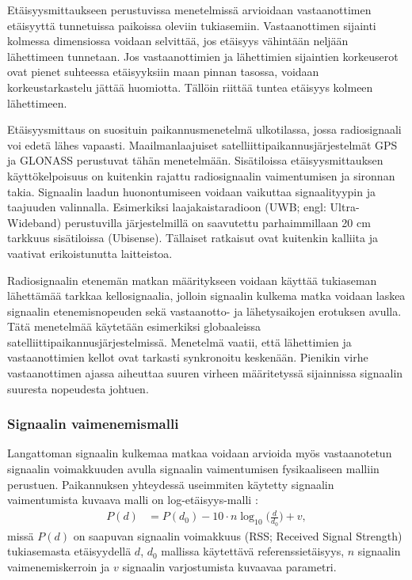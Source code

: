 Etäisyysmittaukseen perustuvissa menetelmissä arvioidaan vastaanottimen
etäisyyttä tunnetuissa paikoissa oleviin tukiasemiin.  Vastaanottimen sijainti
kolmessa dimensiossa voidaan selvittää, jos etäisyys vähintään neljään
lähettimeen tunnetaan. Jos vastaanottimien ja lähettimien sijaintien
korkeuserot ovat pienet suhteessa etäisyyksiin maan pinnan tasossa, voidaan
korkeustarkastelu jättää huomiotta. Tällöin riittää tuntea etäisyys kolmeen
lähettimeen.

Etäisyysmittaus on suosituin paikannusmenetelmä ulkotilassa, jossa
radiosignaali voi edetä lähes vapaasti.  Maailmanlaajuiset
satelliittipaikannusjärjestelmät GPS ja GLONASS perustuvat tähän menetelmään.
Sisätiloissa etäisyysmittauksen käyttökelpoisuus on kuitenkin rajattu
radiosignaalin vaimentumisen ja sironnan takia. Signaalin laadun huonontumiseen
voidaan vaikuttaa signaalityypin ja taajuuden valinnalla. Esimerkiksi
laajakaistaradioon (UWB; engl: Ultra-Wideband) perustuvilla järjestelmillä on
saavutettu parhaimmillaan 20 cm tarkkuus sisätiloissa (Ubisense). Tällaiset
ratkaisut ovat kuitenkin kalliita ja vaativat erikoistunutta laitteistoa.

Radiosignaalin etenemän matkan määritykseen voidaan käyttää tukiaseman
lähettämää tarkkaa kellosignaalia, jolloin signaalin kulkema matka voidaan
laskea signaalin etenemisnopeuden sekä vastaanotto- ja lähetysaikojen erotuksen
avulla. Tätä menetelmää käytetään esimerkiksi globaaleissa
satelliittipaikannusjärjestelmissä. Menetelmä vaatii, että lähettimien ja
vastaanottimien kellot ovat tarkasti synkronoitu keskenään. Pienikin virhe
vastaanottimen ajassa aiheuttaa suuren virheen määritetyssä sijainnissa
signaalin suuresta nopeudesta johtuen.

\subsubsection{Signaalin vaimenemismalli}

Langattoman signaalin kulkemaa matkaa voidaan arvioida myös vastaanotetun
signaalin voimakkuuden avulla signaalin vaimentumisen fysikaaliseen malliin
perustuen. Paikannuksen yhteydessä useimmiten käytetty signaalin vaimentumista
kuvaava malli on log-etäisyys-malli \cite{fadjukoff2013}:
\begin{align}
  P(d) &= P(d_0) - 10 \cdot n \log_{10} \bigg( \frac{d}{d_0} \bigg) + v,
\end{align}
missä $P(d)$ on saapuvan signaalin voimakkuus (RSS; Received Signal Strength)
tukiasemasta etäisyydellä $d$, $d_0$ mallissa käytettävä referenssietäisyys,
$n$ signaalin vaimenemiskerroin ja $v$ signaalin varjostumista kuvaavaa
parametri.


